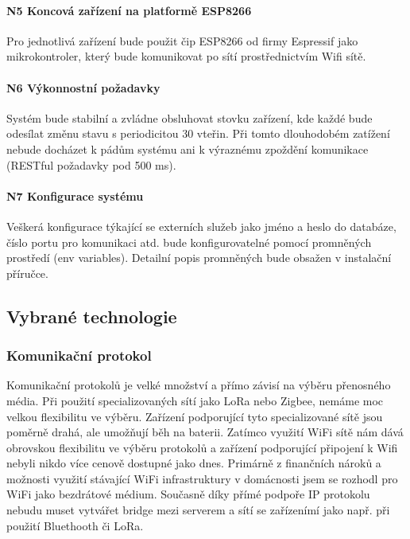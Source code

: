 \paragraph{N5 Koncová zařízení na platformě ESP8266}
Pro jednotlivá zařízení bude použit čip ESP8266 od firmy Espressif jako mikrokontroler, který bude komunikovat po sítí prostřednictvím Wifi sítě.

\paragraph{N6 Výkonnostní požadavky}
Systém bude stabilní a zvládne obsluhovat stovku zařízení, kde každé bude odesílat změnu stavu s periodicitou 30 vteřin. Při tomto dlouhodobém zatížení nebude docházet k pádům systému ani k výraznému zpoždění komunikace (RESTful požadavky pod 500 ms).

\paragraph{N7 Konfigurace systému}
Veškerá konfigurace týkající se externích služeb jako jméno a heslo do databáze, číslo portu pro komunikaci atd. bude konfigurovatelné pomocí promněných prostředí (env variables). Detailní popis promněných bude obsažen v instalační příručce.


\subsection{Vybrané technologie}

\subsubsection{Komunikační protokol}   %
Komunikační protokolů je velké množství a přímo závisí na výběru přenosného média. Při použití specializovaných sítí jako LoRa nebo Zigbee, nemáme moc velkou flexibilitu ve výběru. Zařízení podporující tyto specializované sítě jsou poměrně drahá, ale umožňují běh na baterii. Zatímco využití WiFi sítě nám dává obrovskou flexibilitu ve výběru protokolů a zařízení podporující připojení k Wifi nebyli nikdo více cenově dostupné jako dnes. Primárně z finančních nároků a možnosti využití stávající WiFi infrastruktury v domácnosti jsem se rozhodl pro WiFi jako bezdrátové médium. Současně díky přímé podpoře IP protokolu nebudu muset vytvářet bridge mezi serverem a sítí se zařízenímí jako např. při použití Bluethooth či LoRa.

